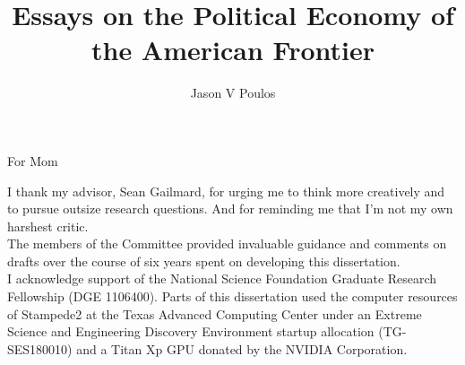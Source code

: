 \documentclass[hidelinks]{ucbthesis}
\begin{document}

\title{Essays on the Political Economy of the American Frontier}
\author{Jason V Poulos}


\maketitle
\copyrightpage



\begin{frontmatter}

\begin{dedication}
\null\vfil
\null\hfil
For Mom
\null\hfil
\vfil\null
\end{dedication}


\tableofcontents

\begin{acknowledgements}
	
I thank my advisor, Sean Gailmard, for urging me to think more creatively and to pursue outsize research questions. And for reminding me that I'm not my own harshest critic.\\

The members of the Committee provided invaluable guidance and comments on drafts over the course of six years spent on developing this dissertation.\\

I acknowledge support of the National Science Foundation Graduate Research Fellowship (DGE 1106400). Parts of this dissertation used the computer resources of Stampede2 at the Texas Advanced Computing Center under an Extreme Science and Engineering Discovery Environment startup allocation (TG-SES180010) and a Titan Xp GPU donated by the NVIDIA Corporation.
\end{acknowledgements}

\end{frontmatter}
\end{document}
